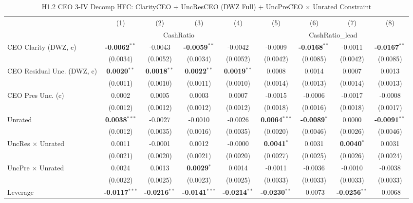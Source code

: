 \begin{landscape}
\begin{table}[H]
\setlength{\tabcolsep}{3pt}
\renewcommand{\arraystretch}{0.85}
\centering
\caption{H1.2 CEO 3-IV Decomp HFC: ClarityCEO + UncResCEO (DWZ Full) + UncPreCEO $\times$ Unrated Constraint}
\label{tab:h1_2_ceo2_decomp}
\scriptsize
\begin{tabular}{lcccccccc}
\toprule
 & (1) & (2) & (3) & (4) & (5) & (6) & (7) & (8) \\
 & \multicolumn{4}{c}{CashRatio} & \multicolumn{4}{c}{CashRatio\_lead} \\
\cmidrule(lr){2-5} \cmidrule(lr){6-9}
\midrule
CEO Clarity (DWZ, c) & \textbf{-0.0062}$^{**}$ & -0.0043 & \textbf{-0.0059}$^{**}$ & -0.0042 & -0.0009 & \textbf{-0.0168}$^{**}$ & -0.0011 & \textbf{-0.0167}$^{**}$ \\
 & (0.0034) & (0.0052) & (0.0034) & (0.0052) & (0.0042) & (0.0085) & (0.0042) & (0.0085) \\
CEO Residual Unc. (DWZ, c) & \textbf{0.0020}$^{**}$ & \textbf{0.0018}$^{**}$ & \textbf{0.0022}$^{**}$ & \textbf{0.0019}$^{**}$ & 0.0008 & 0.0014 & 0.0007 & 0.0013 \\
 & (0.0011) & (0.0010) & (0.0011) & (0.0010) & (0.0014) & (0.0013) & (0.0014) & (0.0013) \\
CEO Pres Unc. (c) & 0.0002 & 0.0005 & 0.0003 & 0.0007 & -0.0015 & -0.0006 & -0.0017 & -0.0008 \\
 & (0.0012) & (0.0012) & (0.0012) & (0.0012) & (0.0018) & (0.0016) & (0.0018) & (0.0017) \\
Unrated & \textbf{0.0038}$^{***}$ & -0.0027 & -0.0010 & -0.0026 & \textbf{0.0064}$^{***}$ & \textbf{-0.0089}$^{*}$ & 0.0000 & \textbf{-0.0091}$^{**}$ \\
 & (0.0012) & (0.0035) & (0.0016) & (0.0035) & (0.0020) & (0.0046) & (0.0026) & (0.0046) \\
UncRes $\times$ Unrated & 0.0011 & -0.0001 & 0.0012 & -0.0000 & \textbf{0.0041}$^{*}$ & 0.0031 & \textbf{0.0040}$^{*}$ & 0.0031 \\
 & (0.0021) & (0.0020) & (0.0021) & (0.0020) & (0.0027) & (0.0025) & (0.0026) & (0.0024) \\
UncPre $\times$ Unrated & 0.0024 & 0.0013 & \textbf{0.0029}$^{*}$ & 0.0014 & -0.0011 & -0.0036 & -0.0010 & -0.0038 \\
 & (0.0022) & (0.0025) & (0.0023) & (0.0025) & (0.0033) & (0.0033) & (0.0033) & (0.0033) \\
\midrule
Leverage & \textbf{-0.0117}$^{***}$ & \textbf{-0.0216}$^{**}$ & \textbf{-0.0141}$^{***}$ & \textbf{-0.0214}$^{**}$ & \textbf{-0.0230}$^{**}$ & -0.0073 & \textbf{-0.0256}$^{**}$ & -0.0068 \\

\end{tabular}
\end{table}
\end{landscape}
